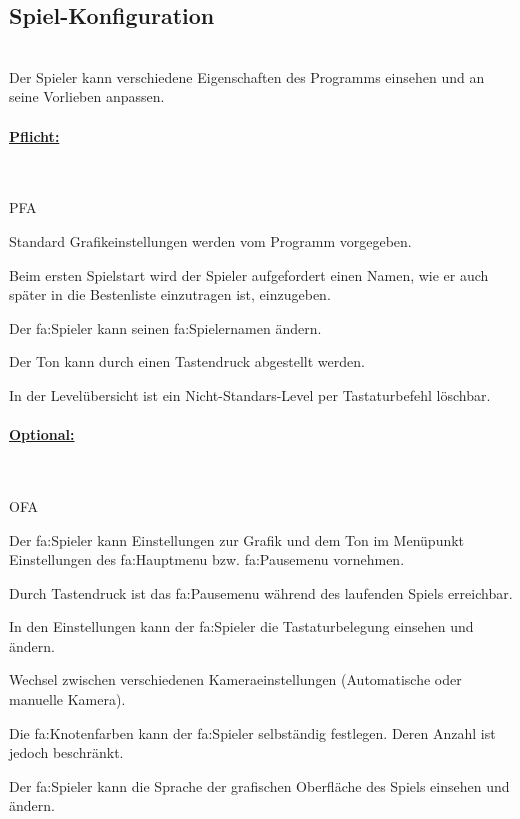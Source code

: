 %
%


\subsection{Spiel-Konfiguration}

%
%
\renewcommand{\K}{}
%
%

~\\
Der Spieler kann verschiedene Eigenschaften des Programms einsehen und an seine Vorlieben anpassen.\\

%
%
\paragraph*{\underline{Pflicht:}}~\\

\begin{ids}{\gls{PFA\K}}

 	\id[ 10] Standard Grafikeinstellungen werden vom Programm vorgegeben.
 	
 	\id[ 15] Beim ersten Spielstart wird der Spieler aufgefordert einen Namen, wie er auch später in die Bestenliste einzutragen ist, einzugeben.
 		
 	\id[ 20] Der \gls{fa:Spieler} kann seinen \gls{fa:Spielername}n ändern.
 	
 	\id[ 25] Der Ton kann durch einen Tastendruck abgestellt werden.
 	
 	\id[ 27] In der Levelübersicht ist ein Nicht-Standars-Level per Tastaturbefehl löschbar.
	
\end{ids}


%
%
\paragraph*{\underline{Optional:}}~\\


\begin{ids}{\gls{OFA\K}}

	\id[ 30] Der \gls{fa:Spieler} kann Einstellungen zur Grafik und dem Ton im Menüpunkt Einstellungen des \gls{fa:Hauptmenu} bzw. \gls{fa:Pausemenu} vornehmen.
	
	\id[ 40] Durch Tastendruck ist das \gls{fa:Pausemenu} während des laufenden Spiels erreichbar.	
	
	\id[ 50] In den Einstellungen kann der \gls{fa:Spieler} die Tastaturbelegung einsehen und  ändern.
	
 	\id[60] Wechsel zwischen verschiedenen Kameraeinstellungen (Automatische oder manuelle Kamera).
 	
 	\id[ 70] Die \gls{fa:Knoten}farben kann der \gls{fa:Spieler} selbständig festlegen. Deren Anzahl ist jedoch beschränkt.
 	
 	\id[ 80] Der \gls{fa:Spieler} kann die Sprache der grafischen Oberfläche des Spiels einsehen und ändern.
 	
\end{ids}


